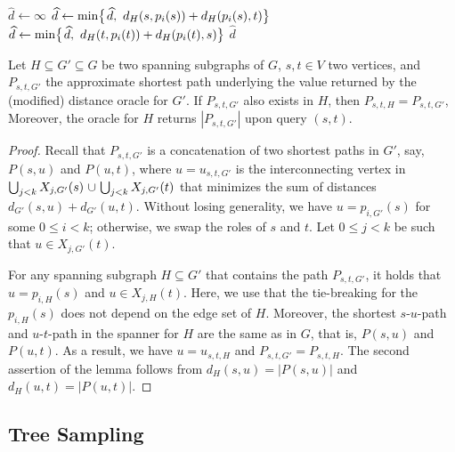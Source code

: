 \documentclass{theoretics}
\newcommand*{\nwspace}{\hspace*{.1em}}
\renewcommand{\le}{\leqslant}
\begin{document}
\setcounter{AlgoLine}{0}
\begin{algorithm}[H]
    $\widehat{d} \gets \infty$\; 
    {
          {$\widehat{d} \gets \min\!\big\{\nwspace \widehat{d}, \
            d_H(s,p_{i}(s)) + d_H(p_{i}(s),t) \big\}$}
          {$\widehat{d} \gets \min\!\big\{ \nwspace \widehat{d}, \
            d_H(t,p_{i}(t))+d_H(p_{i}(t),s) \big\}$}
    }
    \Return $\widehat{d}$\;
    \caption{Modified query algorithm of the distance oracle for the pair $(s,t)$.}
    \label{alg:query_new}
\end{algorithm}

 \begin{lemma}
\label{lem:new_query_inheritance}
  Let $H \subseteq G' \subseteq G$ be two spanning subgraphs of $G$, $s,t \in V$ two vertices,
  and $P_{s,t,G'}$ the approximate shortest path underlying the value returned by the
  (modified) distance oracle for $G'$.
  If $P_{s,t,G'}$ also exists in $H$, then $P_{s,t,H} = P_{s,t,G'}$,
  Moreover, the oracle for $H$ returns $|P_{s,t,G'}|$ upon query $(s,t)$.
\end{lemma}

\begin{proof}
  Recall that $P_{s,t,G'}$ is a concatenation of two shortest paths in $G'$,
  say, $P(s,u)$ and $P(u,t)$, where $u = u_{s,t,G'}$ is the interconnecting
  vertex in $\bigcup_{j<k}X_{j,G'}(s) \nwspace \cup \nwspace \bigcup_{j<k}X_{j,G'}(t)$  
  that minimizes the sum of distances $d_{G'}(s,u)+d_{G'}(u,t)$.
  Without losing generality, we have $u = p_{i,G'}(s)$ for some $0 \le i < k$;
  otherwise, we swap the roles of $s$ and $t$.
  Let $0 \le j < k$ be such that $u \in X_{j,G'}(t)$.
  
  For any spanning subgraph $H \subseteq G'$ that contains the path $P_{s,t,G'}$,
  it holds that $u=p_{i,H}(s)$ and $u \in X_{j,H}(t)$.
  Here, we use that the tie-breaking for the $p_{i,H}(s)$ does not depend on the edge set of $H$.
  Moreover, the shortest $s$-$u$-path and $u$-$t$-path in the spanner for $H$
  are the same as in $G$, that is, $P(s,u)$ and $P(u,t)$.
  As a result, we have $u = u_{s,t,H}$ and $P_{s,t,G'} = P_{s,t,H}$.
  The second assertion of the lemma follows from $d_H(s,u) = |P(s,u)|$ and $d_H(u,t) = |P(u,t)|$.
\end{proof}


\subsection{Tree Sampling}
\label{subsec:short_paths_tree_sampling}
\end{document}
